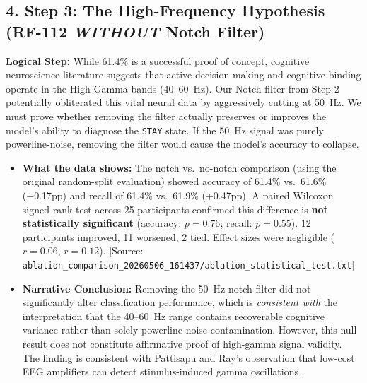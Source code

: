\documentclass[12pt,a4paper]{report}
\begin{document}
\subsection{4. Step 3: The High-Frequency Hypothesis (RF-112 \textit{WITHOUT} Notch Filter)}
\textbf{Logical Step:} While 61.4\% is a successful proof of concept, cognitive neuroscience literature suggests that active decision-making and cognitive binding operate in the High Gamma bands (40--60~Hz). Our Notch filter from Step 2 potentially obliterated this vital neural data by aggressively cutting at 50~Hz. We must prove whether removing the filter actually preserves or improves the model's ability to diagnose the \texttt{STAY} state. If the 50~Hz signal was purely powerline-noise, removing the filter would cause the model's accuracy to collapse.
\begin{itemize}
    \item \textbf{What the data shows:} The notch vs.\ no-notch comparison (using the original random-split evaluation) showed accuracy of 61.4\% vs.\ 61.6\% (+0.17pp) and recall of 61.4\% vs.\ 61.9\% (+0.47pp). A paired Wilcoxon signed-rank test across 25 participants confirmed this difference is \textbf{not statistically significant} (accuracy: $p=0.76$; recall: $p=0.55$). 12 participants improved, 11 worsened, 2 tied. Effect sizes were negligible ($r=0.06$, $r=0.12$). [Source: \verb|ablation_comparison_20260506_161437/ablation_statistical_test.txt|]
    \item \textbf{Narrative Conclusion:} Removing the 50~Hz notch filter did not significantly alter classification performance, which is \textit{consistent with} the interpretation that the 40--60~Hz range contains recoverable cognitive variance rather than solely powerline-noise contamination. However, this null result does not constitute affirmative proof of high-gamma signal validity. The finding is consistent with Pattisapu and Ray's observation that low-cost EEG amplifiers can detect stimulus-induced gamma oscillations \cite{pattisapu_stimulus-induced_2023}.
\end{itemize}
\end{document}
